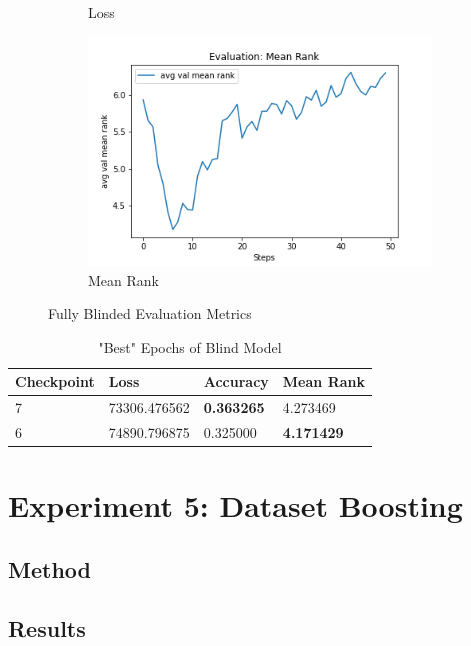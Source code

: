 \begin{figure}[H]
\begin{subfigure}[b]{0.3\textwidth}
         \caption{Loss}
         \label{fig:fb_e_loss}
     \end{subfigure}
     \hfill
     \begin{subfigure}[b]{0.3\textwidth}
         \centering
         \includegraphics[width=\textwidth]{./figure/results/fully_blinded/eval/avg val mean rank.png}
         \caption{Mean Rank}
         \label{fig:fb_e_mean_rank}
     \end{subfigure}
     \caption{Fully Blinded Evaluation Metrics}
     \label{fig:fb_e_metrics}
\end{figure}

\begin{table}[H]
\centering
\caption{"Best" Epochs of Blind Model}
\begin{tabular}{l | l | l | l}
Checkpoint & Loss & Accuracy & Mean Rank \\
\hline
7 & 73306.476562 & \textbf{0.363265} & 4.273469 \\
6 & 74890.796875 & 0.325000 & \textbf{4.171429}
\end{tabular}
\label{tab:best_blind}
\end{table}

\section{Experiment 5: Dataset Boosting}
\label{sec:exp_5}
\subsection{Method}

\subsection{Results}

